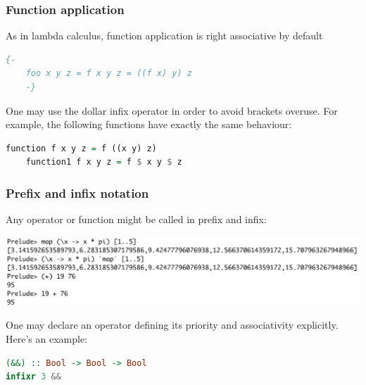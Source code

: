\documentclass[10pt,pdf,utf8,russian,aspectratio=169]{beamer}
\begin{document}
\begin{frame}[fragile]
  \frametitle{Function application}

  As in lambda calculus, function application is right associative by default

  \begin{lstlisting}[language=Haskell]
    {-
    foo x y z = f x y z = ((f x) y) z
    -}
  \end{lstlisting}

\vspace{\baselineskip}

  One may use the dollar infix operator in order to avoid brackets overuse. For example, the following functions have exactly the same behaviour:

  \begin{lstlisting}[language=Haskell]
    function f x y z = f ((x y) z)
    function1 f x y z = f $ x y $ z
  \end{lstlisting}
\end{frame}

\begin{frame}[fragile]
  \frametitle{Prefix and infix notation}
  Any operator or function might be called in prefix and infix:

  \begin{center}
  \includegraphics[scale=0.41]{Pics/InfixPrefix.png}
  \end{center}

  \vspace{\baselineskip}

  One may declare an operator defining its priority and associativity explicitly. Here's an example:

\begin{lstlisting}[language=Haskell]
(&&) :: Bool -> Bool -> Bool
infixr 3 &&
\end{lstlisting}
\end{frame}
\end{document}
